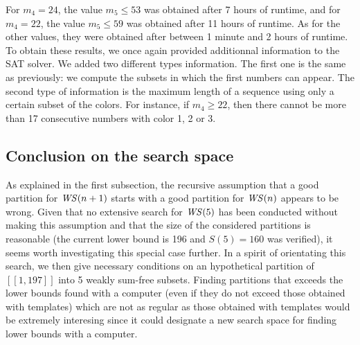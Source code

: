 \resetarraystretch
\setlength{\tabcolsep}{6pt}

For \(m_4 = 24\), the value \(m_5 \leqslant 53\) was obtained after 7 hours of runtime, and for  \(m_4 = 22\), the
value \(m_5 \leqslant 59\) was obtained after 11 hours of runtime. As for the other values, they were obtained after 
between 1 minute and 2 hours of runtime. To obtain these results, we once again provided additionnal information to 
the SAT solver. We added two different types information. The first one is the same as previously: we compute the 
subsets in which the first numbers can appear. The second type of information is the maximum length of a sequence 
using only a certain subset of the colors. For instance, if \(m_4 \geqslant 22\), then there cannot be more than 17 
consecutive numbers with color 1, 2 or 3.


\subsection{Conclusion on the search space}

\qquad As explained in the first subsection, the recursive assumption that a good partition for \(\mathit{WS} (n+1)\) starts with a good partition for 
\(\mathit{WS} (n)\) appears to be wrong. Given that no extensive search for \(\mathit{WS}(5)\) has been conducted without making this assumption and 
that the size of the considered partitions is reasonable (the current lower bound is 196 and \(S(5) = 160\) was verified), it seems worth 
investigating this special case further. In a spirit of orientating this search, we then give necessary conditions on an hypothetical partition 
of \([\![1,197]\!]\) into 5 weakly sum-free subsets. Finding partitions that exceeds the lower bounds found with a computer (even if they 
do not exceed those obtained with templates) which are not as regular as those obtained with templates would be extremely interesing 
since it could designate a new search space for finding lower bounds with a computer.
